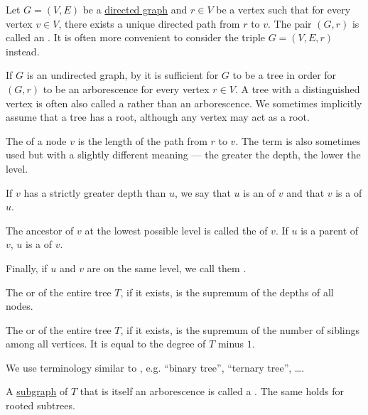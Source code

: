 \begin{definition}\label{def:arborescence}
  Let \( G = (V, E) \) be a \hyperref[def:directed_graph]{directed graph} and \( r \in V \) be a vertex such that for every vertex \( v \in V \), there exists a unique directed path from \( r \) to \( v \). The pair \( (G, r) \) is called an . It is often more convenient to consider the triple \( G = (V, E, r) \) instead.

  If \( G \) is an undirected graph, by  it is sufficient for \( G \) to be a tree in order for \( (G, r) \) to be an arborescence for every vertex \( r \in V \). A tree with a distinguished vertex is often also called a  rather than an arborescence. We sometimes implicitly assume that a tree has a root, although any vertex may act as a root.

  \begin{thmenum}
     The  of a node \( v \) is the length of the path from \( r \) to \( v \). The term  is also sometimes used but with a slightly different meaning --- the greater the depth, the lower the level.

     If \( v \) has a strictly greater depth than \( u \), we say that \( u \) is an  of \( v \) and that \( v \) is a  of \( u \).

    The ancestor of \( v \) at the lowest possible level is called the  of \( v \). If \( u \) is a parent of \( v \), \( u \) is a  of \( v \).

    Finally, if \( u \) and \( v \) are on the same level, we call them .

     The  or  of the entire tree \( T \), if it exists, is the supremum of the depths of all nodes.

     The  or  of the entire tree \( T \), if it exists, is the supremum of the number of siblings among all vertices. It is equal to the degree of \( T \) minus \( 1 \).

    We use terminology similar to , e.g. \enquote{binary tree}, \enquote{ternary tree}, \ldots.

     A \hyperref[def:graph/submodel]{subgraph} of \( T \) that is itself an arborescence is called a . The same holds for rooted subtrees.
  \end{thmenum}
\end{definition}

